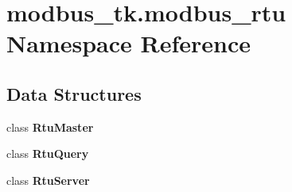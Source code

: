\section{modbus\+\_\+tk.\+modbus\+\_\+rtu Namespace Reference}
\label{namespacemodbus__tk_1_1modbus__rtu}
\subsection*{Data Structures}
\begin{DoxyCompactItemize}
\item 
class {\bf Rtu\+Master}
\item 
class {\bf Rtu\+Query}
\item 
class {\bf Rtu\+Server}
\end{DoxyCompactItemize}
